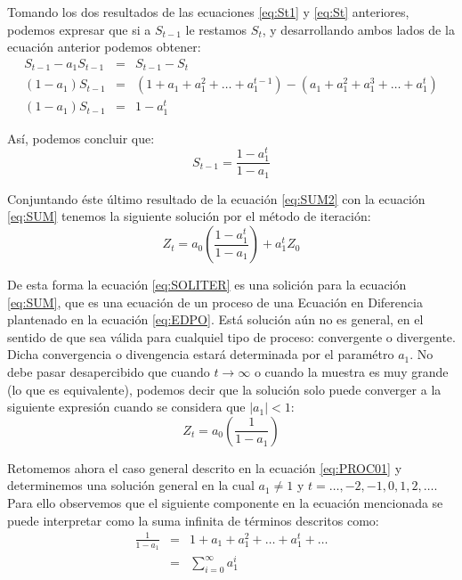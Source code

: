 \documentclass[
]{book}
\begin{document}
Tomando los dos resultados de las ecuaciones \eqref{eq:St1} y \eqref{eq:St} anteriores, podemos expresar que si a \(S_{t-1}\) le restamos \(S_t\), y desarrollando ambos lados de la ecuación anterior podemos obtener:
\begin{eqnarray}
    S_{t-1} - a_1 S_{t-1} & = & S_{t-1} - S_{t} \nonumber \\
    (1 - a_1) S_{t-1} & = & (1 + a_1 + a^2_1 + \ldots + a^{t-1}_1) - (a_1 + a^2_1 + a^3_1 + \ldots + a^{t}_1) \nonumber \\
    (1 - a_1) S_{t-1} & = & 1 - a^{t}_1 \nonumber
\end{eqnarray}

Así, podemos concluir que:
\begin{equation}
    S_{t-1} = \frac{1 - a^{t}_1}{1 - a_1}
    \label{eq:SUM2}
\end{equation}

Conjuntando éste último resultado de la ecuación \eqref{eq:SUM2} con la ecuación \eqref{eq:SUM} tenemos la siguiente solución por el método de iteración:
\begin{equation}
    Z_t = a_0 \left( \frac{1 - a^{t}_1}{1 - a_1} \right) + a^t_1 Z_0
    \label{eq:SOLITER}
\end{equation}

De esta forma la ecuación \eqref{eq:SOLITER} es una solición para la ecuación \eqref{eq:SUM}, que es una ecuación de un proceso de una Ecuación en Diferencia plantenado en la ecuación \eqref{eq:EDPO}. Está solución aún no es general, en el sentido de que sea válida para cualquiel tipo de proceso: convergente o divergente. Dicha convergencia o divengencia estará determinada por el paramétro \(a_1\). No debe pasar desapercibido que cuando \(t \rightarrow \infty\) o cuando la muestra es muy grande (lo que es equivalente), podemos decir que la solución solo puede converger a la siguiente expresión cuando se considera que \(|a_1| < 1\):
\begin{equation}
    Z_t = a_0 \left( \frac{1}{1 - a_1} \right)
    \label{eq:trayec}
\end{equation}

Retomemos ahora el caso general descrito en la ecuación \eqref{eq:PROC01} y determinemos una solución general en la cual \(a_1 \neq 1\) y \(t = \ldots, -2, -1, 0, 1, 2, \ldots\). Para ello observemos que el siguiente componente en la ecuación mencionada se puede interpretar como la suma infinita de términos descritos como:
\begin{eqnarray}
    \frac{1}{1 - a_1} & = & 1 + a_1 + a_1^2 + \ldots + a_1^t + \ldots \nonumber \\
    & = & \sum_{i = 0}^{\infty} a_1^{i}
    \label{eq:SUMINF}
\end{eqnarray}
\end{document}
